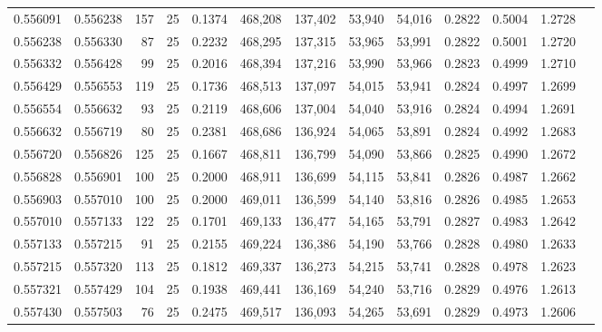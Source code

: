 \begin{tabular}{rrrrrrrrrrrrr}
0.556091 & 0.556238 &   157 &  25 &                                     0.1374 & 468,208 & 137,402 &  53,940 &  54,016 & 0.2822 & 0.5004 & 1.2728 \\
0.556238 & 0.556330 &    87 &  25 &                                     0.2232 & 468,295 & 137,315 &  53,965 &  53,991 & 0.2822 & 0.5001 & 1.2720 \\
0.556332 & 0.556428 &    99 &  25 &                                     0.2016 & 468,394 & 137,216 &  53,990 &  53,966 & 0.2823 & 0.4999 & 1.2710 \\
0.556429 & 0.556553 &   119 &  25 &                                     0.1736 & 468,513 & 137,097 &  54,015 &  53,941 & 0.2824 & 0.4997 & 1.2699 \\
0.556554 & 0.556632 &    93 &  25 &                                     0.2119 & 468,606 & 137,004 &  54,040 &  53,916 & 0.2824 & 0.4994 & 1.2691 \\
0.556632 & 0.556719 &    80 &  25 &                                     0.2381 & 468,686 & 136,924 &  54,065 &  53,891 & 0.2824 & 0.4992 & 1.2683 \\
0.556720 & 0.556826 &   125 &  25 &                                     0.1667 & 468,811 & 136,799 &  54,090 &  53,866 & 0.2825 & 0.4990 & 1.2672 \\
0.556828 & 0.556901 &   100 &  25 &                                     0.2000 & 468,911 & 136,699 &  54,115 &  53,841 & 0.2826 & 0.4987 & 1.2662 \\
0.556903 & 0.557010 &   100 &  25 &                                     0.2000 & 469,011 & 136,599 &  54,140 &  53,816 & 0.2826 & 0.4985 & 1.2653 \\
0.557010 & 0.557133 &   122 &  25 &                                     0.1701 & 469,133 & 136,477 &  54,165 &  53,791 & 0.2827 & 0.4983 & 1.2642 \\
0.557133 & 0.557215 &    91 &  25 &                                     0.2155 & 469,224 & 136,386 &  54,190 &  53,766 & 0.2828 & 0.4980 & 1.2633 \\
0.557215 & 0.557320 &   113 &  25 &                                     0.1812 & 469,337 & 136,273 &  54,215 &  53,741 & 0.2828 & 0.4978 & 1.2623 \\
0.557321 & 0.557429 &   104 &  25 &                                     0.1938 & 469,441 & 136,169 &  54,240 &  53,716 & 0.2829 & 0.4976 & 1.2613 \\
0.557430 & 0.557503 &    76 &  25 &                                     0.2475 & 469,517 & 136,093 &  54,265 &  53,691 & 0.2829 & 0.4973 & 1.2606 \\

\end{tabular}
